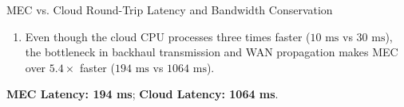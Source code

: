 \begin{solved}{MEC vs. Cloud Round-Trip Latency and Bandwidth Conservation}
\begin{enumerate}[leftmargin=*]
  \begin{equation}
  T_{\text{trans, cloud}} = \frac{S}{R_{\text{cloud}}} = \frac{16\text{ Mb}}{20\text{ Mbps}} = 0.800\text{ s} = 800\text{ ms}
  \end{equation}
  \begin{equation}
  T_{\text{total, Cloud}} = T_{\text{radio}} + T_{\text{trans, radio}} + T_{\text{wan}} + T_{\text{trans, cloud}} + T_{\text{proc, Cloud}} + T_{\text{wan}} + T_{\text{radio}}
  \end{equation}
  \begin{equation}
  T_{\text{total, Cloud}} = 2 + 160 + 45 + 800 + 10 + 45 + 2 = 1064\text{ ms}
  \end{equation}
  \item Even though the cloud CPU processes three times faster ($10\text{ ms}$ vs $30\text{ ms}$), the bottleneck in backhaul transmission and WAN propagation makes MEC over $5.4\times$ faster ($194\text{ ms}$ vs $1064\text{ ms}$).
\end{enumerate}
\Answer \textbf{MEC Latency: 194 ms}; \textbf{Cloud Latency: 1064 ms}.
\end{solved}

